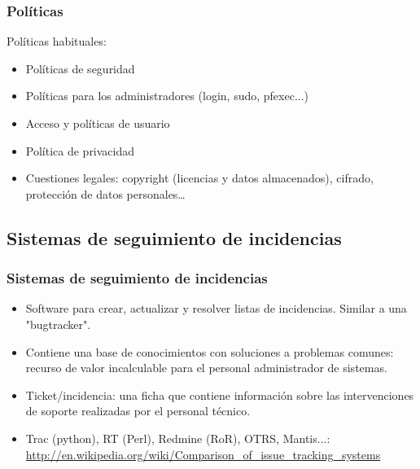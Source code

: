 \documentclass{beamer}
\begin{document}

\begin{frame}
\frametitle{Políticas}

Políticas habituales:

\begin{itemize}
\item Políticas de seguridad
\item Políticas para los administradores (login, sudo, pfexec...)
\item Acceso y políticas de usuario
\item Política de privacidad
\item Cuestiones legales: copyright (licencias y datos almacenados), cifrado, protección de datos personales\dots
\end{itemize}
\end{frame}



\subsection{Sistemas de seguimiento de incidencias}

\begin{frame}
\frametitle{Sistemas de seguimiento de incidencias}

\begin{itemize}
\item Software para crear, actualizar y resolver listas de incidencias. Similar a una 
"bugtracker". 
\item Contiene una base de conocimientos con soluciones a problemas comunes: recurso de valor incalculable para el personal administrador de sistemas. 
\item \alert{Ticket/incidencia:} una ficha que contiene información sobre las intervenciones de soporte realizadas por el personal técnico. 
\item Trac (python), RT (Perl), Redmine (RoR), OTRS, Mantis...: \url{http://en.wikipedia.org/wiki/Comparison_of_issue_tracking_systems}
\end{itemize}
\end{frame}

\end{document}
